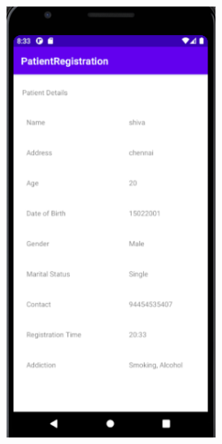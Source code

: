 \documentclass[12pt,letterpaper]{article}
\begin{document}
\begin{figure}
    \centering
    \includegraphics[height=14cm, keepaspectratio]{Outputs/OP2.png}
\end{figure}
\end{document}
